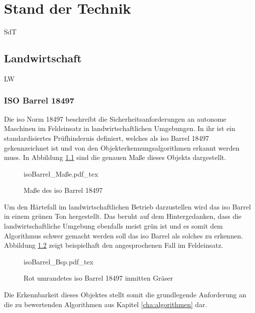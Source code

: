\documentclass[12pt,
titlepage,
a4paper,
oneside,     %
openany,     %
listof=totoc,  %
numbers = noenddot, %
bibliography=totoc,    %
headsepline, %
]{scrbook} %
\begin{document}
\chapter{Stand der Technik}
\label{cha:sdT}

SdT

\section{Landwirtschaft}
\label{sec_landwirtschaft}

LW

\subsection{ISO Barrel 18497}
\label{subsec_iso}

Die \ac{iso} Norm 18497 beschreibt die Sicherheitsanforderungen an autonome Maschinen im Feldeinsatz in landwirtschaftlichen Umgebungen. In ihr ist ein standardisiertes Prüfhindernis definiert, welches als \ac{iso} Barrel 18497 gekennzeichnet ist und von den Objekterkennungsalgorithmen erkannt werden muss. In Abbildung \ref{fig:isoBarrel} sind die genauen Maße dieses Objekts dargestellt. \\

\begin{figure}[h]
	\centering
	\def\svgwidth{0.6\columnwidth}
	{isoBarrel_Maße.pdf_tex}
	\caption{Maße des \ac{iso} Barrel 18497}
	\label{fig:isoBarrel}
\end{figure}

Um den Härtefall im landwirtschaftlichen Betrieb darzustellen wird das \ac{iso} Barrel in einem grünen Ton hergestellt. Das beruht auf dem Hintergedanken, dass die landwirtschaftliche Umgebung ebenfalls meist grün ist und es somit dem Algorithmus schwer gemacht werden soll das \ac{iso} Barrel als solches zu erkennen. Abbildung \ref{fig:isoBarrelBsp} zeigt beispielhaft den angesprochenen Fall im Feldeinsatz. \\

\begin{figure}[h]
	\centering
	\def\svgwidth{0.8\columnwidth}
	{isoBarrel_Bsp.pdf_tex}
	\caption{Rot umrandetes \ac{iso} Barrel 18497 inmitten Gräser}
	\label{fig:isoBarrelBsp}
\end{figure}

Die Erkennbarkeit dieses Objektes stellt somit die grundlegende Anforderung an die zu bewertenden Algorithmen aus Kapitel \ref{cha:algorithmen} dar.
\end{document}
